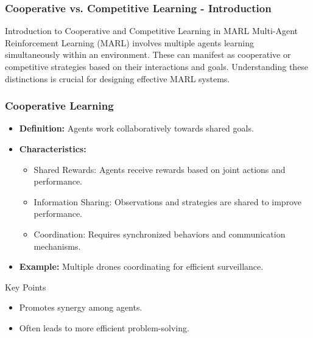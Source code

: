 \documentclass[aspectratio=169]{beamer}
\begin{document}
\begin{frame}[fragile]
    \frametitle{Cooperative vs. Competitive Learning - Introduction}
    \begin{block}{Introduction to Cooperative and Competitive Learning in MARL}
        Multi-Agent Reinforcement Learning (MARL) involves multiple agents learning simultaneously within an environment. 
        These can manifest as cooperative or competitive strategies based on their interactions and goals.
        Understanding these distinctions is crucial for designing effective MARL systems.
    \end{block}
\end{frame}

\begin{frame}[fragile]
    \frametitle{Cooperative Learning}
    \begin{itemize}
        \item \textbf{Definition:} Agents work collaboratively towards shared goals.
        \item \textbf{Characteristics:}
        \begin{itemize}
            \item Shared Rewards: Agents receive rewards based on joint actions and performance.
            \item Information Sharing: Observations and strategies are shared to improve performance.
            \item Coordination: Requires synchronized behaviors and communication mechanisms.
        \end{itemize}
        \item \textbf{Example:} Multiple drones coordinating for efficient surveillance.
    \end{itemize}
    \begin{block}{Key Points}
        \begin{itemize}
            \item Promotes synergy among agents.
            \item Often leads to more efficient problem-solving.
        \end{itemize}
    \end{block}
\end{frame}
\end{document}
